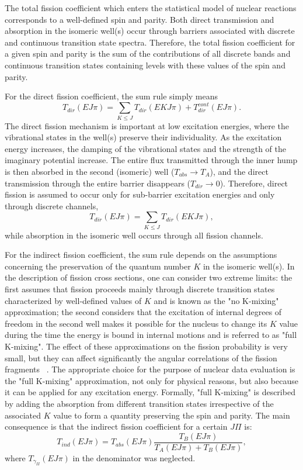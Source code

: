 The total fission coefficient which enters the statistical model of nuclear
reactions corresponds to a well-defined spin and parity. Both direct transmission
and absorption in the isomeric well(s) occur through barriers associated
with discrete and continuous transition state spectra. Therefore, the total
fission coefficient for a given spin and parity is the sum of the
contributions of all discrete bands and continuous transition states
containing levels with these values of the spin and parity.

For the direct fission coefficient, the sum rule simply means
\begin{equation}
T_{dir}(EJ\pi)= \sum_{K\le J}T_{dir}(EKJ\pi)+ T_{dir}^{cont}(EJ\pi).
\end{equation}
The direct fission mechanism is important at low excitation energies, where
the vibrational states in the well(s) preserve their individuality.
As the excitation energy increases, the damping of the vibrational states
and the strength of the imaginary potential increase. The
entire flux transmitted through the inner hump is then absorbed in the second
(isomeric) well ($T_{abs}\rightarrow T_{A}$), and the direct transmission
through the entire barrier disappears ($T_{dir}\rightarrow0$). Therefore,
direct fission is assumed to occur only for sub-barrier excitation
energies and only through discrete channels,
\begin{equation}
T_{dir}(EJ\pi)=\sum_{K\le J}T_{dir}(EKJ\pi),  \label{tdirt}
\end{equation}
while absorption in the isomeric well occurs through all fission
channels.

For the indirect fission coefficient, the sum rule depends
on the assumptions concerning the preservation of the quantum number $K$ in
the isomeric well(s). In the description of fission cross sections, one can
consider two extreme limits: the first assumes that fission
proceeds mainly through discrete transition states characterized by well-defined
values of $K$ and is known as the "no K-mixing" approximation; the second
considers that the excitation of internal degrees of freedom in the second
well makes it possible for the nucleus to change its $K$ value during the
time the energy is bound in internal motions and is referred to
as "full K-mixing". The effect of these approximations on the fission
probability is very small, but they can affect significantly the angular
correlations of the fission fragments ~\cite{Back:74}. The appropriate
choice for the purpose of nuclear data evaluation is the "full K-mixing"
approximation, not only for physical reasons, but also because it can be
applied for any excitation energy. Formally, "full K-mixing" is described by
adding the absorption from different transition states irrespective of the
associated $K$ value to form a quantity preserving the spin and parity. The
main consequence is that the indirect fission coefficient for a certain $%
J\Pi $ is:
\begin{equation}
T_{ind}(E J \pi)=T_{abs}(E J \pi)\frac{T_{B}(E J \pi)}{T_{A}(E J
\pi)+T_{B}(E J \pi)},  \label{tind1}
\end{equation}
where $T_{\gamma_{II}}(E J \pi)$ in the denominator was neglected.

